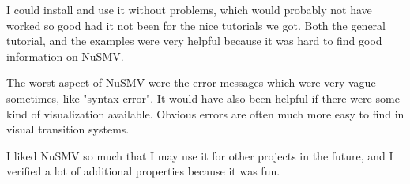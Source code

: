 \documentclass[12pt, a4paper]{article}
\begin{document}
I could install and use it without problems, which would probably not have worked so good had it not been for the nice tutorials we got. Both the general tutorial, and the examples were very helpful because it was hard to find good information on NuSMV.

The worst aspect of NuSMV were the error messages which were very vague sometimes, like "syntax error". It would have also been helpful if there were some kind of visualization available. Obvious errors are often much more easy to find in visual transition systems.

I liked NuSMV so much that I may use it for other projects in the future, and I verified a lot of additional properties because it was fun.
\end{document}
